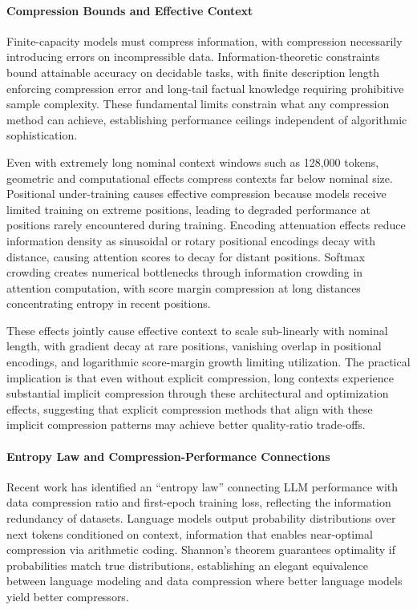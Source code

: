\documentclass[11pt,letterpaper]{article}
\begin{document}
\paragraph{Compression Bounds and Effective Context}

Finite-capacity models must compress information, with compression necessarily introducing errors on incompressible data. Information-theoretic constraints bound attainable accuracy on decidable tasks, with finite description length enforcing compression error and long-tail factual knowledge requiring prohibitive sample complexity. These fundamental limits constrain what any compression method can achieve, establishing performance ceilings independent of algorithmic sophistication.

Even with extremely long nominal context windows such as 128,000 tokens, geometric and computational effects compress contexts far below nominal size. Positional under-training causes effective compression because models receive limited training on extreme positions, leading to degraded performance at positions rarely encountered during training. Encoding attenuation effects reduce information density as sinusoidal or rotary positional encodings decay with distance, causing attention scores to decay for distant positions. Softmax crowding creates numerical bottlenecks through information crowding in attention computation, with score margin compression at long distances concentrating entropy in recent positions.

These effects jointly cause effective context to scale sub-linearly with nominal length, with gradient decay at rare positions, vanishing overlap in positional encodings, and logarithmic score-margin growth limiting utilization. The practical implication is that even without explicit compression, long contexts experience substantial implicit compression through these architectural and optimization effects, suggesting that explicit compression methods that align with these implicit compression patterns may achieve better quality-ratio trade-offs.

\paragraph{Entropy Law and Compression-Performance Connections}

Recent work has identified an ``entropy law'' connecting LLM performance with data compression ratio and first-epoch training loss, reflecting the information redundancy of datasets. Language models output probability distributions over next tokens conditioned on context, information that enables near-optimal compression via arithmetic coding. Shannon's theorem guarantees optimality if probabilities match true distributions, establishing an elegant equivalence between language modeling and data compression where better language models yield better compressors.
\end{document}
